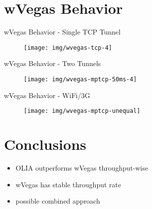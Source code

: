\documentclass{beamer}
\begin{document}
\section{wVegas Behavior}
\begin{frame}{wVegas Behavior - Single TCP Tunnel}
  \begin{figure}
    \texttt{[image: img/wvegas-tcp-4]}
  \end{figure}
\end{frame}
\begin{frame}{wVegas Behavior - Two Tunnels}
  \begin{figure}
    \texttt{[image: img/wvegas-mptcp-50ms-4]}
  \end{figure}
\end{frame}
\begin{frame}{wVegas Behavior - WiFi/3G}
  \begin{figure}
    \texttt{[image: img/wvegas-mptcp-unequal]}
  \end{figure}
\end{frame}

\section{Conclusions}
\begin{frame}
  \begin{itemize}
    \item OLIA outperforms wVegas throughput-wise
    \item wVegas has stable throughput rate
    \item possible combined approach
  \end{itemize}
\end{frame}
\end{document}
